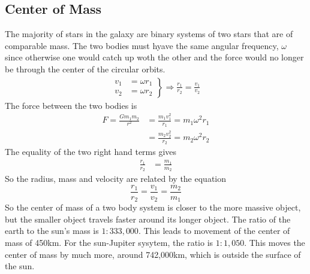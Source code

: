 \documentclass[british]{article}
\begin{document}
\subsection{Center of Mass}
The majority of stars in the galaxy are binary systems of two stars that are of comparable mass. The two bodies must hyave the same angular frequency, $\omega$ since otherwise one would catch up woth the other and the force would no longer be through the center of the circular orbits.
\begin{align*}
\left.\begin{array}{cc}
	v_1 &= \omega r_1 \\
	v_2 &= \omega r_2
\end{array}\right\} \Rightarrow \frac{r_1}{r_2} = \frac{v_1}{v_2}
\end{align*}
The force between the two bodies is
\begin{align*}
	F = \frac{Gm_1m_2}{r^2} &= \frac{m_1v_1^2}{r_1} = m_1\omega^2 r_1 \\
	&= \frac{m_2v_2^2}{r_2} = m_2\omega^2 r_2
\end{align*}
The equality of the two right hand terms gives
\begin{align*}
	\frac{r_1}{r_2} &= \frac{m_1}{m_2}
\end{align*}
So the radius, mass and velocity are related by the equation
\begin{equation*}
	\frac{r_1}{r_2} = \frac{v_1}{v_2} = \frac{m_2}{m_1}
\end{equation*}
So the center of mass of a two body system is closer to the more massive object, but the smaller object travels faster around its longer object. The ratio of the earth to the sun's mass is $1:333,000$. This leads to movement of the center of mass of 450km. For the sun-Jupiter sysytem, the ratio is $1:1,050$. This moves the center of mass by much more, around 742,000km, which is outside the surface of the sun.
\end{document}
